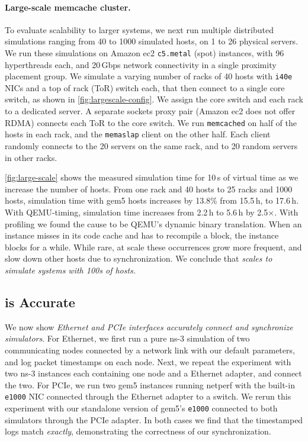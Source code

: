\paragraph{Large-scale memcache cluster.}
To evaluate scalability to larger systems, we next run multiple
distributed simulations ranging from 40 to 1000 simulated hosts, on 1
to 26 physical servers.
%
We run these simulations on Amazon ec2 \texttt{c5.metal} (spot)
instances, with 96 hyperthreads each, and 20\,Gbps network
connectivity in a single proximity placement group.
%
We simulate a varying number of racks of 40 hosts with \texttt{i40e}
NICs and a top of rack (ToR) switch each, that then connect to a
single core switch, as shown in \autoref{fig:largescale-config}.
%
We assign the core switch and each rack to a dedicated server.
%
A separate sockets proxy pair (Amazon ec2 does not offer RDMA)
connects each ToR to the core switch.
%
We run \texttt{memcached} on half of the hosts in each rack, and the
\texttt{memaslap} client on the other half.
%
Each client randomly connects to the 20 servers on the same rack, and
to 20 random servers in other racks.

\autoref{fig:large-scale} shows the measured simulation time for 10\,s
of virtual time as we increase the number of hosts.
%
From one rack and 40 hosts to 25 racks and 1000 hosts,
simulation time with gem5 hosts increases by 13.8\% from 15.5\,h,
to 17.6\,h.
%
With QEMU-timing, simulation time increases from 2.2\,h to 5.6\,h by
2.5$\times$.
%
With profiling we found the cause to be QEMU's dynamic binary
translation.
%
When an instance misses in its code cache and has to recompile a
block, the instance blocks for a while.
%
While rare, at scale these occurrences grow more frequent, and slow down
other hosts due to synchronization.
%
We conclude that \emph{\sysname scales to simulate systems with 100s
of hosts.}


\subsection{\sysname is Accurate}
\label{ssec:eval:accurate}
We now show \emph{\sysname Ethernet and PCIe interfaces accurately
connect and synchronize simulators}.
%
For Ethernet, we first run a pure ns-3 simulation of two communicating
nodes connected by a network link with our default parameters, and
log packet timestamps on each node.
%
Next, we repeat the experiment with two ns-3 instances each containing
one node and a \sysname Ethernet adapter, and connect the two.
%
For PCIe, we run two gem5 instances running netperf with the built-in
\texttt{e1000} NIC connected through the \sysname Ethernet adapter to a
switch.
%
We rerun this experiment with our standalone version of
gem5's \texttt{e1000} connected to both simulators through the \sysname
PCIe adapter.
%
In both cases we find that the timestamped logs match \textit{exactly},
demonstrating the correctness of our synchronization.


